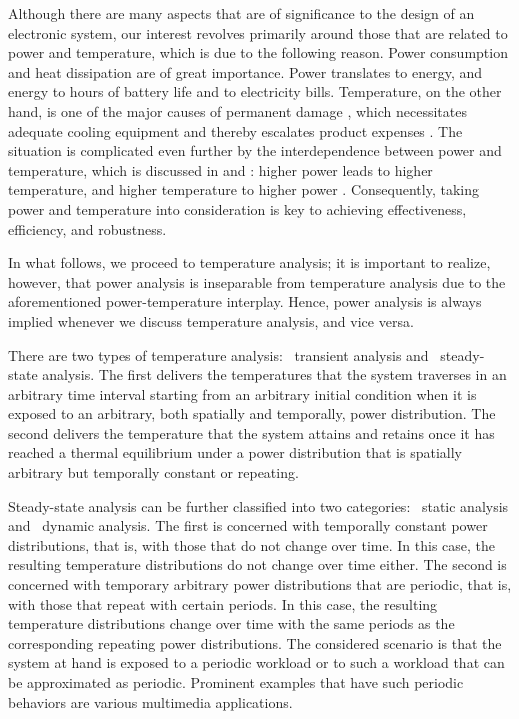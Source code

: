 Although there are many aspects that are of significance to the design of an
electronic system, our interest revolves primarily around those that are related
to power and temperature, which is due to the following reason. Power
consumption and heat dissipation are of great importance. Power translates to
energy, and energy to hours of battery life and to electricity bills.
Temperature, on the other hand, is one of the major causes of permanent damage
\cite{jedec2016}, which necessitates adequate cooling equipment and thereby
escalates product expenses \cite{chaudhry2015}. The situation is complicated
even further by the interdependence between power and temperature, which is
discussed in  and : higher power leads
to higher temperature, and higher temperature to higher power \cite{liu2007}.
Consequently, taking power and temperature into consideration is key to
achieving effectiveness, efficiency, and robustness.

In what follows, we proceed to temperature analysis; it is important to realize,
however, that power analysis is inseparable from temperature analysis due to the
aforementioned power-temperature interplay. Hence, power analysis is always
implied whenever we discuss temperature analysis, and vice versa.

There are two types of temperature analysis: \one~transient analysis and
\two~steady-state analysis. The first delivers the temperatures that the system
traverses in an arbitrary time interval starting from an arbitrary initial
condition when it is exposed to an arbitrary, both spatially and temporally,
power distribution. The second delivers the temperature that the system attains
and retains once it has reached a thermal equilibrium under a power distribution
that is spatially arbitrary but temporally constant or repeating.

Steady-state analysis can be further classified into two categories: \one~static
analysis and \two~dynamic analysis. The first is concerned with temporally
constant power distributions, that is, with those that do not change over time.
In this case, the resulting temperature distributions do not change over time
either. The second is concerned with temporary arbitrary power distributions
that are periodic, that is, with those that repeat with certain periods. In this
case, the resulting temperature distributions change over time with the same
periods as the corresponding repeating power distributions. The considered
scenario is that the system at hand is exposed to a periodic workload or to such
a workload that can be approximated as periodic. Prominent examples that have
such periodic behaviors are various multimedia applications.
